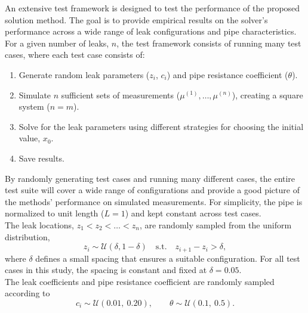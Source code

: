 An extensive test framework is designed to test the performance of the proposed solution method. The goal is to provide empirical results on the solver's performance across a wide range of leak configurations and pipe characteristics. For a given number of leaks, $n$, the test framework consists of running many test cases, where each test case consists of:
\begin{enumerate}
    \item Generate random leak parameters ($z_i$, $c_i$) and pipe resistance coefficient ($\theta$).
    \item Simulate $n$ sufficient sets of measurements ($\mu^{(1)},\dots,\mu^{(n)}$), creating a square system ($n=m$).
    \item Solve for the leak parameters using different strategies for choosing the initial value, $x_0$.
    \item Save results.
\end{enumerate}

By randomly generating test cases and running many different cases, the entire test suite will cover a wide range of configurations and provide a good picture of the methods' performance on simulated measurements. For simplicity, the pipe is normalized to unit length ($L=1$) and kept constant across test cases.\\

The leak locations, $z_1 < z_2 < \dots < z_n$, are randomly sampled from the uniform distribution,
\begin{equation}
\label{eq:zi_sampled}
    z_i \sim \mathcal{U}(\delta,1-\delta) \quad \text{s.t.} \quad z_{i+1}-z_i > \delta,
\end{equation}
where $\delta$ defines a small spacing that ensures a suitable configuration. For all test cases in this study, the spacing is constant and fixed at $\delta=0.05$.\\

The leak coefficients and pipe resistance coefficient are randomly sampled according to
\begin{equation}
\label{eq:ci_theta_sample}
    c_i \sim \mathcal{U}(0.01, \ 0.20), \qquad \theta \sim \mathcal{U}(0.1, \ 0.5).
\end{equation}\\

